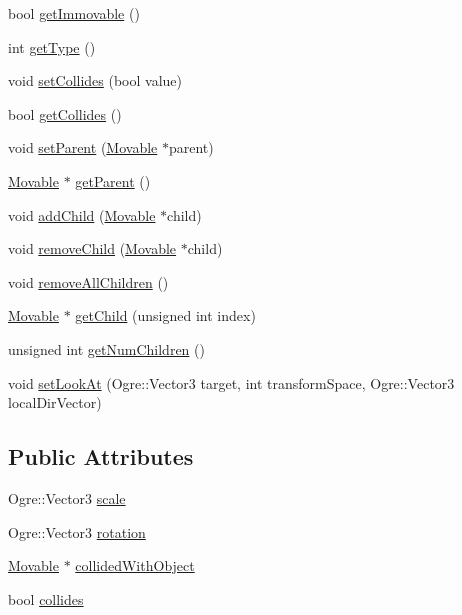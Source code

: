 \begin{DoxyCompactItemize}
\item 
bool \hyperlink{class_rad_xml_1_1_movable_a9c3a2c3ccce67462b43ca7bf9d8ba53f}{get\-Immovable} ()
\item 
int \hyperlink{class_rad_xml_1_1_movable_acda306c7c857069bae1eff519ccd65c7}{get\-Type} ()
\item 
void \hyperlink{class_rad_xml_1_1_movable_a58c1cd1d17fc619db5d1b753108b314c}{set\-Collides} (bool value)
\item 
bool \hyperlink{class_rad_xml_1_1_movable_a76f2d5016a49fe2414aa11d538aa1f6b}{get\-Collides} ()
\item 
void \hyperlink{class_rad_xml_1_1_movable_a3ef12d2561cb90c61466c2da2946152e}{set\-Parent} (\hyperlink{class_rad_xml_1_1_movable}{Movable} $\ast$parent)
\item 
\hyperlink{class_rad_xml_1_1_movable}{Movable} $\ast$ \hyperlink{class_rad_xml_1_1_movable_a60fdb43cc0ffd18ced685b936a33ba07}{get\-Parent} ()
\item 
void \hyperlink{class_rad_xml_1_1_movable_af14b657fa5a04bfa541fa1b873a60e89}{add\-Child} (\hyperlink{class_rad_xml_1_1_movable}{Movable} $\ast$child)
\item 
void \hyperlink{class_rad_xml_1_1_movable_af51a6d86e3958c36e3bb945f067fc044}{remove\-Child} (\hyperlink{class_rad_xml_1_1_movable}{Movable} $\ast$child)
\item 
void \hyperlink{class_rad_xml_1_1_movable_aa29244d007c7a24d6250b83c8593aa3a}{remove\-All\-Children} ()
\item 
\hyperlink{class_rad_xml_1_1_movable}{Movable} $\ast$ \hyperlink{class_rad_xml_1_1_movable_aafdf585d768ae11a6aab0e1e29609c6d}{get\-Child} (unsigned int index)
\item 
unsigned int \hyperlink{class_rad_xml_1_1_movable_a792ea0d34b0516fd683695933dbc8564}{get\-Num\-Children} ()
\item 
void \hyperlink{class_rad_xml_1_1_movable_a2446fe34b6fd5460b16b61d87df7ac60}{set\-Look\-At} (Ogre\-::\-Vector3 target, int transform\-Space, Ogre\-::\-Vector3 local\-Dir\-Vector)
\end{DoxyCompactItemize}
\subsection*{Public Attributes}
\begin{DoxyCompactItemize}
\item 
Ogre\-::\-Vector3 \hyperlink{class_rad_xml_1_1_movable_a3de3093817a316ee72d98287685e88fe}{scale}
\item 
Ogre\-::\-Vector3 \hyperlink{class_rad_xml_1_1_movable_a47fdedc6734fda7e25a22e4527f56cc4}{rotation}
\item 
\hyperlink{class_rad_xml_1_1_movable}{Movable} $\ast$ \hyperlink{class_rad_xml_1_1_movable_a624600f78a33a6b6a49c9352948f57a7}{collided\-With\-Object}
\item 
bool \hyperlink{class_rad_xml_1_1_movable_ad48b86b6ae47d1eb8b617f261e1e78a9}{collides}
\end{DoxyCompactItemize}
